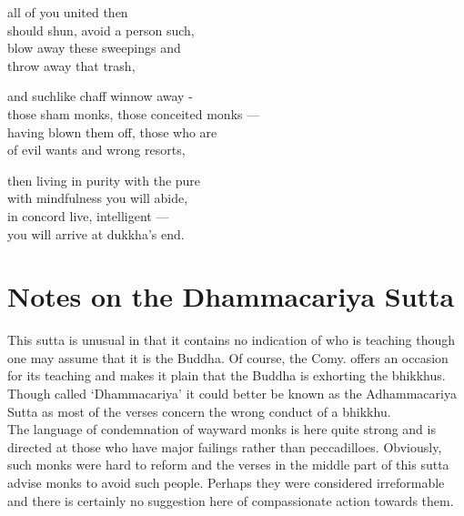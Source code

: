 \begin{MyDescription}{}
all of you united then\\
should shun, avoid a person such,\\
blow away these sweepings and\\
throw away that trash,
\end{MyDescription}  
  
\begin{MyDescription}{}
and suchlike chaff winnow away -\\
those sham monks, those conceited monks —\\
having blown them off, those who are\\
of evil wants and wrong resorts,
\end{MyDescription}     

\begin{MyDescription}{}
then living in purity with the pure\\
with mindfulness you will abide,\\
in concord live, intelligent —\\
you will arrive at dukkha's end.
\end{MyDescription}   

\begin{MyDescription}[(Sn. 274-283)]{}
\end{MyDescription}      
  
\newpage  
   
\section{Notes on the Dhammacariya Sutta}
This sutta is unusual in that it contains no indication of who is teaching though one may assume that it is the Buddha. Of course, the Comy. offers an occasion for its teaching and makes it plain that the Buddha is exhorting the bhikkhus. Though called `Dhammacariya' it could better be known as the Adhammacariya Sutta as most of the verses concern the wrong conduct of a bhikkhu.\\

The language of condemnation of wayward monks is here quite strong and is directed at those who have major failings rather than peccadilloes. Obviously, such monks were hard to reform and the verses in the middle part of this sutta advise monks to avoid such people. Perhaps they were considered irreformable and there is certainly no suggestion here of compassionate action towards them.\\

